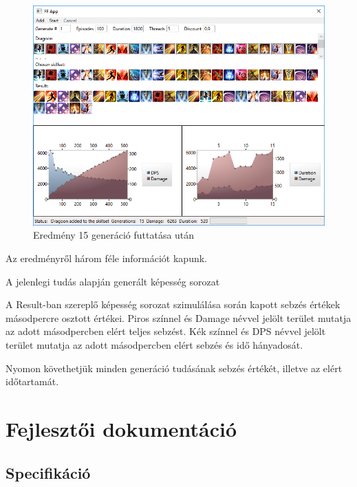 \documentclass[12pt]{article}
\begin{document}
	\begin{figure}[H]
		\begin{center}
			\includegraphics[width=1\textwidth]{15gen}
		\end{center}
		\caption{Eredmény 15 generáció futtatása után}
		\label{fig:15gen}
	\end{figure}
	
	Az eredményről három féle információt kapunk. 
	
	\begin{description}[align=left,labelwidth=3cm]
		\item [Result] A jelenlegi tudás alapján generált képesség sorozat
		\item [Bal grafikon] A Result-ban szereplő képesség sorozat szimulálása során kapott sebzés értékek másodpercre osztott értékei. Piros színnel és Damage névvel jelölt terület mutatja az adott másodpercben elért teljes sebzést. Kék színnel és DPS névvel jelölt terület mutatja az adott másodpercben elért sebzés és idő hányadosát.
		\item [Jobb grafikon] Nyomon követhetjük minden generáció tudásának sebzés értékét, illetve az elért időtartamát.
	\end{description}
	
	\section{Fejlesztői dokumentáció}
	
	\subsection{Specifikáció}
	
\end{document}
